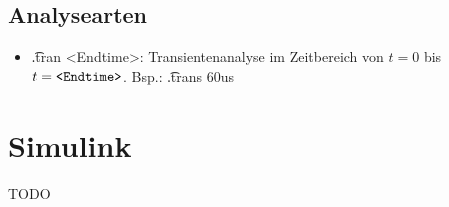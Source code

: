 \documentclass[fs, footer]{latex4ei}
\begin{document}
\begin{multicols*}{4}
    \subsection{Analysearten}
    \begin{itemize}
        \item \t{.tran <Endtime>}: Transientenanalyse im Zeitbereich von $t = 0$ bis $t = \text{\texttt{<Endtime>}}$. Bsp.: \t{.trans 60us}
    \end{itemize}

    \section{Simulink}
    TODO %

\end{multicols*}
\end{document}
